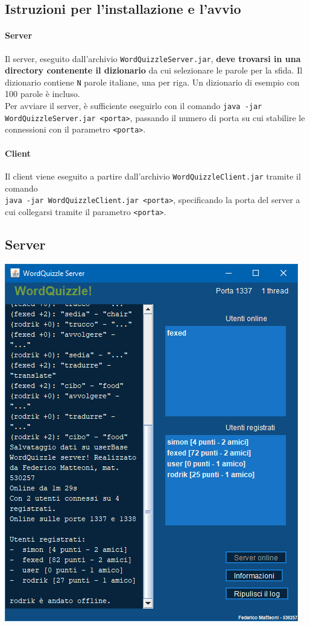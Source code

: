 \documentclass[10pt]{article}
\begin{document}
{\subsection{Istruzioni per l'installazione e l'avvio}
\paragraph{Server} Il server, eseguito dall'archivio \texttt{WordQuizzleServer.jar}, \textbf{deve trovarsi in una directory contenente il dizionario} da cui selezionare le parole per la sfida. Il dizionario contiene \texttt{N} parole italiane, una per riga. Un dizionario di esempio con 100 parole è incluso.\\
Per avviare il server, è sufficiente eseguirlo con il comando \texttt{java -jar WordQuizzleServer.jar <porta>}, passando il numero di porta su cui stabilire le connessioni con il parametro \texttt{<porta>}.
\paragraph{Client} Il client viene eseguito a partire dall'archivio \texttt{WordQuizzleClient.jar} tramite il comando\\\texttt{java -jar WordQuizzleClient.jar <porta>}, specificando la porta del server a cui collegarsi tramite il parametro \texttt{<porta>}.
\pagebreak
\subsection{Server}
\begin{center}
\includegraphics[scale=0.75]{server.png}
\end{center}
}
\end{document}

